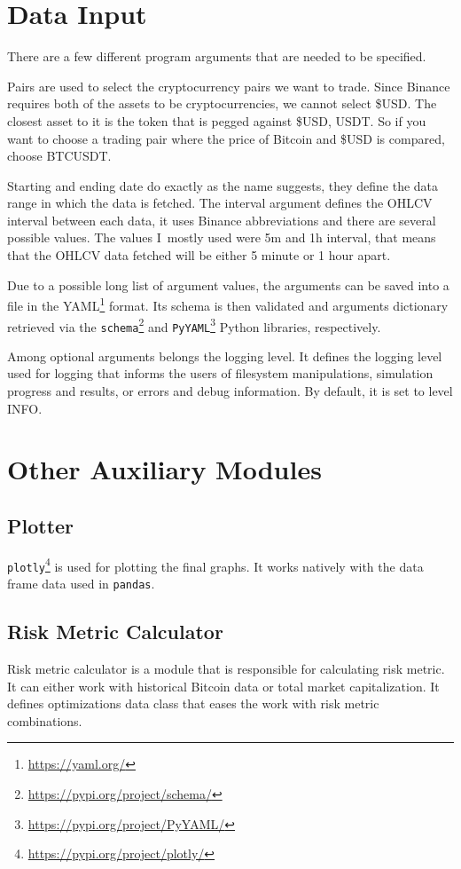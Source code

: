 \section{Data Input}
There are a few different program arguments that are needed to be specified.

Pairs are used to select the cryptocurrency pairs we want to trade. Since Binance requires both of the assets to be cryptocurrencies, we cannot select \$USD. The closest asset to it is the token that is pegged against \$USD, USDT. So if you want to choose a trading pair where the price of Bitcoin and \$USD is compared, choose BTCUSDT.

Starting and ending date do exactly as the name suggests, they define the data range in which the data is fetched. The interval argument defines the OHLCV interval between each data, it uses Binance abbreviations and there are several possible values. The values I~mostly used were 5m and 1h interval, that means that the OHLCV data fetched will be either 5 minute or 1 hour apart.

Due to a possible long list of argument values, the arguments can be saved into a file in the YAML\footnote{\url{https://yaml.org/}} format. Its schema is then validated and arguments dictionary retrieved via the \texttt{schema}\footnote{\url{https://pypi.org/project/schema/}} and \texttt{PyYAML}\footnote{\url{https://pypi.org/project/PyYAML/}} Python libraries, respectively.

Among optional arguments belongs the logging level. It defines the logging level used for logging that informs the users of filesystem manipulations, simulation progress and results, or errors and debug information. By default, it is set to level INFO.

\section{Other Auxiliary Modules}

\subsection*{Plotter}
\texttt{plotly}\footnote{\url{https://pypi.org/project/plotly/}} is used for plotting the final graphs. It works natively with the data frame data used in \texttt{pandas}.

\subsection*{Risk Metric Calculator}
Risk metric calculator is a module that is responsible for calculating risk metric. It can either work with historical Bitcoin data or total market capitalization. It defines optimizations data class that eases the work with risk metric combinations.

